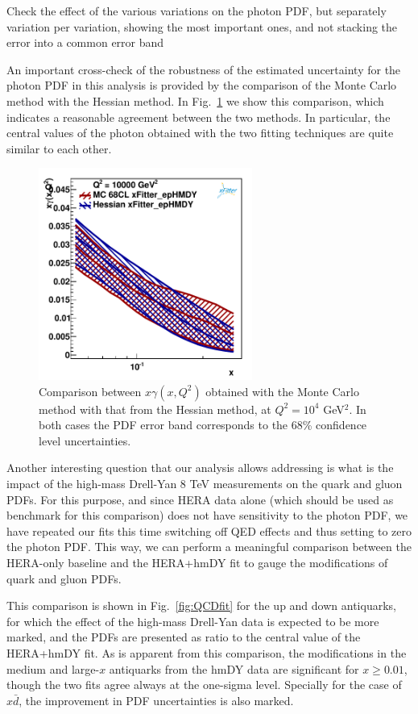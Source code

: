 Check the effect of the various variations on the photon PDF, but separately variation per variation,
showing the most important ones, and not stacking the error into a common error band


An important cross-check of the robustness of the estimated uncertainty for the photon
PDF in this analysis is provided by the comparison of the Monte Carlo method
with the Hessian method.
%
In Fig.~\ref{fig:photon_mc_vs_hessian} we show this comparison,
which indicates a reasonable agreement between the two methods.
%
In particular, the central values of the photon obtained with the two fitting
techniques are quite similar to each other.

\begin{figure}[h]
\centering
\includegraphics[width=7cm]{figs/photon_mc_vs_hessian} 
\caption{Comparison between $x\gamma(x,Q^2)$ obtained with the
  Monte Carlo method with that from the Hessian method,
  at $Q^2=10^4$ GeV$^2$.
  In both cases the PDF error band corresponds to the 68\% confidence level
  uncertainties.}
\label{fig:photon_mc_vs_hessian}
\end{figure}

Another interesting question that our analysis allows addressing is what is
the impact of the high-mass Drell-Yan 8 TeV measurements on the quark and gluon
PDFs.
%
For this purpose, and since HERA data alone (which should be used as benchmark for
this comparison) does not have sensitivity to the photon PDF,
we have repeated our fits this time switching off QED effects and thus setting to zero
the photon PDF.
%
This way, we can perform a meaningful comparison between the HERA-only baseline and the
HERA+hmDY fit to gauge the modifications of quark and gluon PDFs.

This comparison is shown in Fig.~\ref{fig:QCDfit} for the up and down antiquarks,
for which the effect of the high-mass
Drell-Yan data is expected to be more marked, and the PDFs are presented
as ratio to the central value of the HERA+hmDY fit.
%
As is apparent from this comparison, the modifications in the medium and large-$x$
antiquarks from the hmDY data are significant for $x\ge 0.01$, though the two fits
agree always at the one-sigma level.
%
Specially for the case of $x\bar{d}$, the improvement in PDF uncertainties
is also marked.

